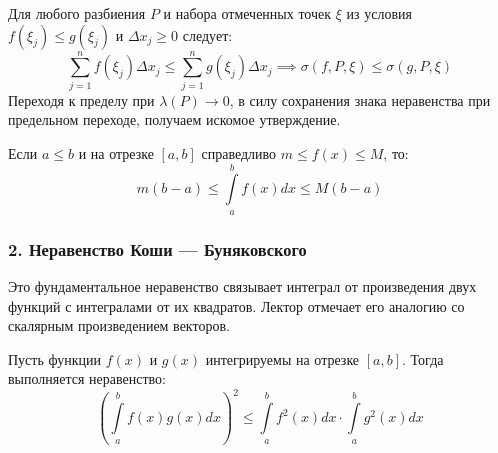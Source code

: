 \begin{tcolorbox}[title=Доказательство, breakable]
Для любого разбиения $P$ и набора отмеченных точек $\xi$ из условия $f(\xi_j) \le g(\xi_j)$ и $\Delta x_j \ge 0$ следует:
\[ \sum_{j=1}^n f(\xi_j) \Delta x_j \le \sum_{j=1}^n g(\xi_j) \Delta x_j \implies \sigma(f, P, \xi) \le \sigma(g, P, \xi) \]
Переходя к пределу при $\lambda(P) \to 0$, в силу сохранения знака неравенства при предельном переходе, получаем искомое утверждение.
\end{tcolorbox}

\begin{consequence}
Если $a \le b$ и на отрезке $[a, b]$ справедливо $m \le f(x) \le M$, то:
\[ m(b-a) \le \int\limits_a^b f(x) dx \le M(b-a) \]
\end{consequence}

\subsubsection*{2. Неравенство Коши — Буняковского}

Это фундаментальное неравенство связывает интеграл от произведения двух функций с интегралами от их квадратов. Лектор отмечает его аналогию со скалярным произведением векторов.

\begin{theorem}
Пусть функции $f(x)$ и $g(x)$ интегрируемы на отрезке $[a, b]$. Тогда выполняется неравенство:
\[ \left( \int\limits_a^b f(x) g(x) dx \right)^2 \le \int\limits_a^b f^2(x) dx \cdot \int\limits_a^b g^2(x) dx \]
\end{theorem}

